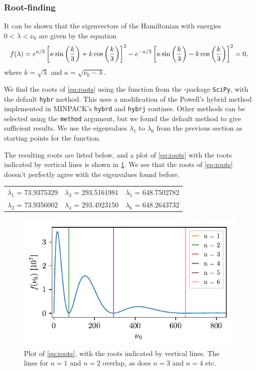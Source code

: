 \subsubsection*{Root-finding}
It can be shown that the eigenvectors of the Hamiltonian with energies $0 < \lambda < \nu_0$ are given by the equation
\begin{equation}
    f(\lambda) = e^{\kappa/3}\sbr{\kappa\sin\del{\frac{k}{3}} + k\cos\del{\frac{k}{3}}}^2 - e^{-\kappa/3}\sbr{\kappa\sin\del{\frac{k}{3}} - k\cos\del{\frac{k}{3}}}^2 = 0,
    \label{eq:roots}
\end{equation}
where $k = \sqrt{\lambda}$ and $\kappa = \sqrt{\nu_0 - \lambda}$.

We find the roots of \cref{eq:roots} using the function  from the \python-package \texttt{SciPy}, with the default \verb!hybr! method. This uses a modification of the Powell's hybrid method\cite{powell1970hybrid} implemented in MINPACK’s \verb!hybrd! and \verb!hybrj! routines. Other methods can be selected using the \verb!method! argument, but we found the default method to give sufficient results. We use the eigenvalues $\lambda_1$ to $\lambda_6$ from the previous section as starting points for the function. 

The resulting roots are listed below, and a plot of \cref{eq:roots} with the roots indicated by vertical lines is shown in \cref{fig:roots}. We see that the roots of \cref{eq:roots} doesn't perfectly agree with the eigenvalues found before.

\begin{center}
\begin{tabular}{ccc}
$\lambda_1$ = 73.9375329 &$\lambda_3$ = 293.5161981 &$\lambda_5$ = 648.7502782 \\
$\lambda_2$ = 73.9356002 &$\lambda_4$ = 293.4923150 &$\lambda_6$ = 648.2643732
\end{tabular}
\end{center}

\begin{figure}[ht!]%
\centering%
\includegraphics{figs/roots_with_roots.pdf}%
\caption{Plot of \cref{eq:roots}, with the roots indicated by vertical lines. The lines for $n=1$ and $n=2$ overlap, as does $n=3$ and $n=4$ etc. \label{fig:roots}}%
\end{figure}

